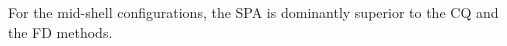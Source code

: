 \documentclass[%
superscriptaddress,
preprint,
showpacs,
nofootinbib,
amsmath,amssymb,
aps,
prc,
floatfix ]%
{revtex4-1}
\begin{document}
For the mid-shell configurations, the SPA is dominantly superior to the
CQ and the FD methods.

\end{document}

